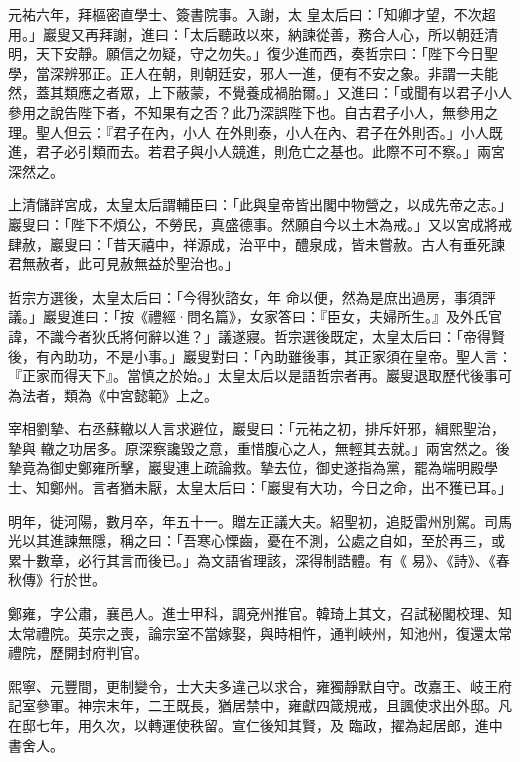 \begin{pinyinscope}
 元祐六年，拜樞密直學士、簽書院事。入謝，太
 皇太后曰：「知卿才望，不次超用。」巖叟又再拜謝，進曰：「太后聽政以來，納諫從善，務合人心，所以朝廷清明，天下安靜。願信之勿疑，守之勿失。」復少進而西，奏哲宗曰：「陛下今日聖學，當深辨邪正。正人在朝，則朝廷安，邪人一進，便有不安之象。非謂一夫能然，蓋其類應之者眾，上下蔽蒙，不覺養成禍胎爾。」又進曰：「或聞有以君子小人參用之說告陛下者，不知果有之否？此乃深誤陛下也。自古君子小人，無參用之理。聖人但云：『君子在內，小人
 在外則泰，小人在內、君子在外則否。」小人既進，君子必引類而去。若君子與小人競進，則危亡之基也。此際不可不察。」兩宮深然之。



 上清儲詳宮成，太皇太后謂輔臣曰：「此與皇帝皆出閣中物營之，以成先帝之志。」巖叟曰：「陛下不煩公，不勞民，真盛德事。然願自今以土木為戒。」又以宮成將戒肆赦，巖叟曰：「昔天禧中，祥源成，治平中，醴泉成，皆未嘗赦。古人有垂死諫君無赦者，此可見赦無益於聖治也。」



 哲宗方選後，太皇太后曰：「今得狄諮女，年
 命以便，然為是庶出過房，事須評議。」巖叟進曰：「按《禮經·問名篇》，女家答曰：『臣女，夫婦所生。』及外氏官諱，不識今者狄氏將何辭以進？」議遂寢。哲宗選後既定，太皇太后曰：「帝得賢後，有內助功，不是小事。」巖叟對曰：「內助雖後事，其正家須在皇帝。聖人言：『正家而得天下』。當慎之於始。」太皇太后以是語哲宗者再。巖叟退取歷代後事可為法者，類為《中宮懿範》上之。



 宰相劉摯、右丞蘇轍以人言求避位，巖叟曰：「元祐之初，排斥奸邪，緝熙聖治，摯與
 轍之功居多。原深察讒毀之意，重惜腹心之人，無輕其去就。」兩宮然之。後摯竟為御史鄭雍所擊，巖叟連上疏論救。摯去位，御史遂指為黨，罷為端明殿學士、知鄭州。言者猶未厭，太皇太后曰：「巖叟有大功，今日之命，出不獲已耳。」



 明年，徙河陽，數月卒，年五十一。贈左正議大夫。紹聖初，追貶雷州別駕。司馬光以其進諫無隱，稱之曰：「吾寒心慄齒，憂在不測，公處之自如，至於再三，或累十數章，必行其言而後已。」為文語省理該，深得制誥體。有《
 易》、《詩》、《春秋傳》行於世。



 鄭雍，字公肅，襄邑人。進士甲科，調兗州推官。韓琦上其文，召試秘閣校理、知太常禮院。英宗之喪，論宗室不當嫁娶，與時相忤，通判峽州，知池州，復還太常禮院，歷開封府判官。



 熙寧、元豐間，更制變令，士大夫多違己以求合，雍獨靜默自守。改嘉王、岐王府記室參軍。神宗末年，二王既長，猶居禁中，雍獻四箴規戒，且諷使求出外邸。凡在邸七年，用久次，以轉運使秩留。宣仁後知其賢，及
 臨政，擢為起居郎，進中書舍人。




\end{pinyinscope}
